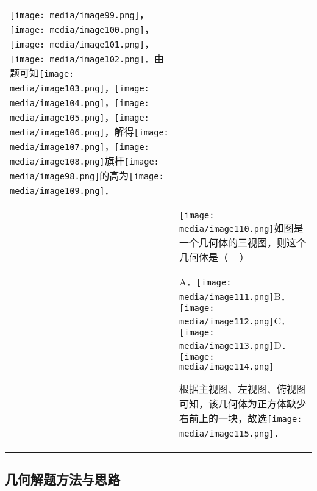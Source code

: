 \documentclass[a4paper,11pt,UTF8]{ctexart}
\begin{document}
\begin{longtable}[]{@{}ll@{}}
\begin{minipage}[t]{0.47\columnwidth}
\texttt{[image: media/image99.png]}，\texttt{[image: media/image100.png]}，\texttt{[image: media/image101.png]}，\texttt{[image: media/image102.png]}．由题可知\texttt{[image: media/image103.png]}，\texttt{[image: media/image104.png]}，\texttt{[image: media/image105.png]}，\texttt{[image: media/image106.png]}，解得\texttt{[image: media/image107.png]}，\texttt{[image: media/image108.png]}旗杆\texttt{[image: media/image98.png]}的高为\texttt{[image: media/image109.png]}．\strut
\end{minipage}\tabularnewline
\begin{minipage}[t]{0.47\columnwidth}\raggedright
\strut
\end{minipage} & \begin{minipage}[t]{0.47\columnwidth}\raggedright
\texttt{[image: media/image110.png]}如图是一个几何体的三视图，则这个几何体是（
~ ）

A．\texttt{[image: media/image111.png]}B．\texttt{[image: media/image112.png]}C．\texttt{[image: media/image113.png]}D．\texttt{[image: media/image114.png]}

根据主视图、左视图、俯视图可知，该几何体为正方体缺少右前上的一块，故选\texttt{[image: media/image115.png]}．\strut
\end{minipage}\tabularnewline
\bottomrule
\end{longtable}

\hypertarget{ux51e0ux4f55ux89e3ux9898ux65b9ux6cd5ux4e0eux601dux8def}{%
\subsection{\texorpdfstring{
几何解题方法与思路}{ 几何解题方法与思路}}\label{ux51e0ux4f55ux89e3ux9898ux65b9ux6cd5ux4e0eux601dux8def}}
\end{document}
